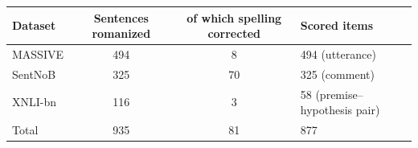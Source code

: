 \begin{tabular}{@{}lccl@{}}\toprule
Dataset & Sentences romanized & of which spelling corrected & Scored items \\\midrule
MASSIVE & 494 & 8 & 494 (utterance) \\
SentNoB & 325 & 70 & 325 (comment) \\
XNLI-bn & 116 & 3 & 58 (premise--hypothesis pair) \\
\midrule
Total & 935 & 81 & 877 \\
\bottomrule\end{tabular}
